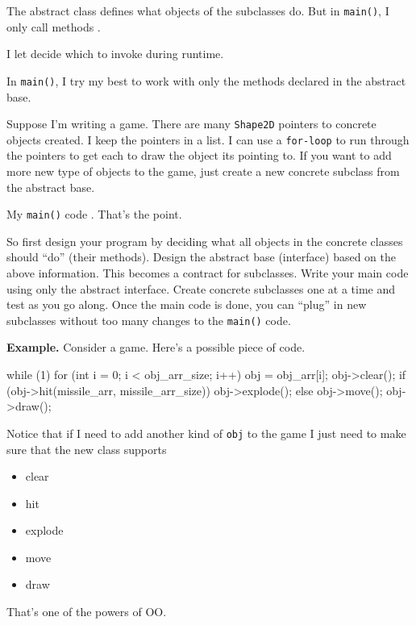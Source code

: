 The abstract class defines what objects of the subclasses  do. But in \verb!main()!, I only call methods .

I let  decide which  to invoke during runtime.

In \verb!main()!, I try my best to work with only the methods declared in the abstract base.

Suppose I'm writing a game. There are many \verb!Shape2D! pointers to concrete objects created. I keep the pointers in a list. I can use a \verb!for-loop! to run through the pointers to get each to draw the object its pointing to. If you want to add more new type of objects to the game, just create a new concrete subclass from the abstract base.

My \verb!main()! code . That's the point.

So first design your program by deciding  what all objects in the concrete classes should ``do'' (their methods). Design the abstract base (interface) based on the above information. This becomes a contract for subclasses. Write your main code using only the abstract interface. Create concrete subclasses one at a time and test as you go along. Once the main code is done, you can ``plug'' in new subclasses without too many changes to the \verb!main()! code.


\textbf{Example.} Consider a game. Here's a possible piece of code.
\begin{console}
while (1)
{   
    for (int i = 0; i < obj_arr_size; i++)
    {   
        obj = obj_arr{[}i{]};
        obj->clear();
        if (obj->hit(missile_arr, missile_arr_size))
           obj->explode();
        else
           obj->move();
           obj->draw();
    }
}
\end{console}


Notice that if I need to add another kind of \verb!obj! to the game I
just need to make sure that the new class supports


\begin{itemize}
\item  
  clear
\item
  hit
\item
  explode
\item
  move
\item
  draw
\end{itemize}

That's one of the powers of OO.

